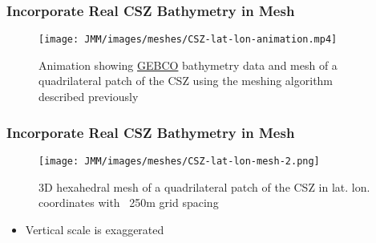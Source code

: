 \begin{frame}
    \frametitle{Incorporate Real CSZ Bathymetry in Mesh}
    \begin{figure}
        \centering
        \texttt{[image: JMM/images/meshes/CSZ-lat-lon-animation.mp4]}
        \caption{Animation showing \href{https://www.gebco.net/data_and_products/gridded_bathymetry_data/}{GEBCO} bathymetry data and mesh of a quadrilateral patch of the CSZ using the meshing algorithm described previously}
    \end{figure}
\end{frame}

\begin{frame}
    \frametitle{Incorporate Real CSZ Bathymetry in Mesh}
    \begin{figure}
        \centering
        \texttt{[image: JMM/images/meshes/CSZ-lat-lon-mesh-2.png]}
        \caption{3D hexahedral mesh of a quadrilateral patch of the CSZ in lat. lon. coordinates with ~250m grid spacing}
    \end{figure}
    \begin{itemize}
        \item Vertical scale is exaggerated
    \end{itemize}
\end{frame}
